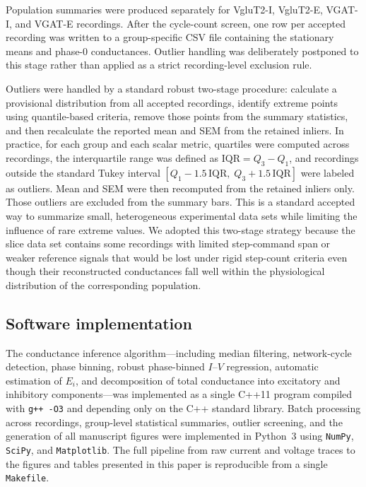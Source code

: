 \documentclass[
]{article}
\begin{document}
Population summaries were produced separately for VgluT2-I, VgluT2-E, VGAT-I, and VGAT-E recordings. After the cycle-count screen, one row per accepted recording was written to a group-specific CSV file containing the stationary means and phase-0 conductances. Outlier handling was deliberately postponed to this stage rather than applied as a strict recording-level exclusion rule.

Outliers were handled by a standard robust two-stage procedure: calculate a provisional distribution from all accepted recordings, identify extreme points using quantile-based criteria, remove those points from the summary statistics, and then recalculate the reported mean and SEM from the retained inliers. In practice, for each group and each scalar metric, quartiles were computed across recordings, the interquartile range was defined as \(\mathrm{IQR}=Q_3-Q_1\), and recordings outside the standard Tukey interval
$\left[Q_1 - 1.5\,\mathrm{IQR},\; Q_3 + 1.5\,\mathrm{IQR}\right]$
were labeled as outliers. Mean and SEM were then recomputed from the retained inliers only. Those outliers are excluded from the summary bars. This is a standard accepted way to summarize small, heterogeneous experimental data sets while limiting the influence of rare extreme values. We adopted this two-stage strategy because the slice data set contains some recordings with limited step-command span or weaker reference signals that would be lost under rigid step-count criteria even though their reconstructed conductances fall well within the physiological distribution of the corresponding population.

\subsection{Software implementation}\label{software-implementation}

The conductance inference algorithm---including median filtering, network-cycle detection, phase binning, robust phase-binned \(I\)--\(V\) regression, automatic estimation of \(E_{i}\), and decomposition of total conductance into excitatory and inhibitory components---was implemented as a single C++11 program compiled with \texttt{g++ -O3} and depending only on the C++ standard library. Batch processing across recordings, group-level statistical summaries, outlier screening, and the generation of all manuscript figures were implemented in Python~3 using \texttt{NumPy}, \texttt{SciPy}, and \texttt{Matplotlib}. The full pipeline from raw current and voltage traces to the figures and tables presented in this paper is reproducible from a single \texttt{Makefile}.
\end{document}
